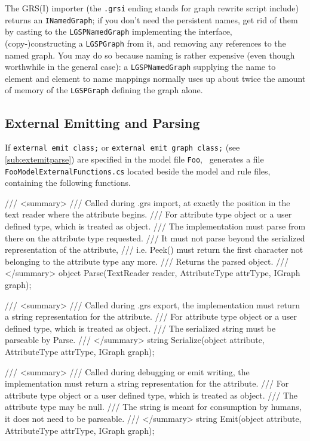 The GRS(I) importer (the \texttt{.grsi} ending stands for graph rewrite script include) returns an \texttt{INamedGraph};
if you don't need the persistent names, get rid of them by casting to the \texttt{LGSPNamedGraph} implementing the interface, (copy-)constructing a \texttt{LGSPGraph} from it, and removing any references to the named graph.
You may do so because naming is rather expensive (even though worthwhile in the general case):
a \texttt{LGSPNamedGraph} supplying the name to element and element to name mappings normally uses up about twice the amount of memory of the \texttt{LGSPGraph} defining the graph alone.

\subsection*{External Emitting and Parsing}\label{sub:apiextemitparse}
If \texttt{external emit class;} or \texttt{external emit graph class;} (see \ref{sub:extemitparse}) are specified in the model file \texttt{Foo}, \GrG~generates a file \texttt{FooModelExternalFunctions.cs} located beside the model and rule files,
containing the following functions.

\begin{csharplet}
/// <summary>
/// Called during .grs import, at exactly the position in the text reader where the attribute begins.
/// For attribute type object or a user defined type, which is treated as object.
/// The implementation must parse from there on the attribute type requested.
/// It must not parse beyond the serialized representation of the attribute, 
/// i.e. Peek() must return the first character not belonging to the attribute type any more.
/// Returns the parsed object.
/// </summary>
object Parse(TextReader reader, AttributeType attrType, IGraph graph);

/// <summary>
/// Called during .grs export, the implementation must return a string representation for the attribute.
/// For attribute type object or a user defined type, which is treated as object.
/// The serialized string must be parseable by Parse.
/// </summary>
string Serialize(object attribute, AttributeType attrType, IGraph graph);

/// <summary>
/// Called during debugging or emit writing, the implementation must return a string representation for the attribute.
/// For attribute type object or a user defined type, which is treated as object.
/// The attribute type may be null.
/// The string is meant for consumption by humans, it does not need to be parseable.
/// </summary>
string Emit(object attribute, AttributeType attrType, IGraph graph);
\end{csharplet}

